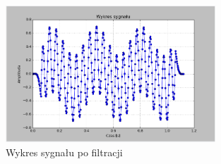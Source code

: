 \documentclass{article}
\begin{document}
{{            \begin{figure}[h!]
                \centering
                \includegraphics[width=0.7\textwidth]{img/fil24.png}
                \caption{Wykres sygnału po filtracji}
            \end{figure}
            \FloatBarrier
        }
        \newpage

}
\end{document}
